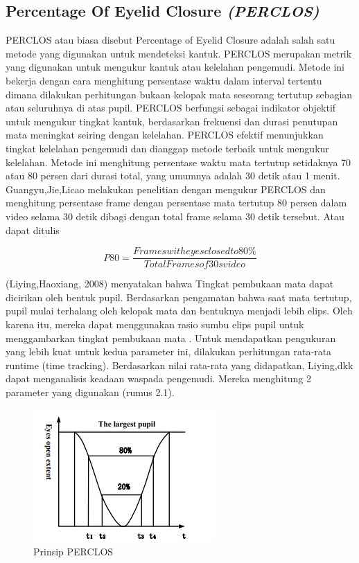 \subsection{Percentage Of Eyelid Closure \emph{(PERCLOS)}}
PERCLOS atau biasa disebut Percentage of Eyelid Closure adalah salah 
satu metode yang digunakan untuk mendeteksi kantuk.
PERCLOS merupakan metrik yang digunakan untuk mengukur kantuk 
atau kelelahan pengemudi. Metode ini bekerja dengan cara 
menghitung persentase waktu dalam interval tertentu dimana dilakukan 
perhitungan bukaan kelopak mata seseorang tertutup sebagian atau 
seluruhnya di atas pupil. PERCLOS berfungsi sebagai indikator 
objektif untuk mengukur tingkat kantuk, berdasarkan frekuensi dan 
durasi penutupan mata meningkat seiring dengan kelelahan. 
PERCLOS efektif menunjukkan tingkat kelelahan pengemudi dan 
dianggap metode terbaik untuk mengukur kelelahan. Metode ini 
menghitung persentase waktu mata tertutup setidaknya 70 
atau 80 persen dari durasi total, yang umumnya adalah 30 
detik atau 1 menit. Guangyu,Jie,Licao melakukan penelitian dengan 
mengukur PERCLOS dan menghitung persentase frame dengan persentase mata tertutup 80 persen dalam video selama 30 detik 
dibagi dengan total frame selama 30 detik tersebut\parencite{Liu2023}. Atau dapat ditulis

\begin{equation}
  P80 = \frac{Frames with eyes closed to 80\% }{Total Frames of 30s video}
\end{equation}

(Liying,Haoxiang, 2008) menyatakan bahwa Tingkat pembukaan mata 
dapat dicirikan oleh bentuk pupil. Berdasarkan pengamatan bahwa 
saat mata tertutup, pupil mulai terhalang oleh kelopak mata dan 
bentuknya menjadi lebih elips. Oleh karena itu, mereka dapat 
menggunakan rasio sumbu elips pupil untuk menggambarkan tingkat 
pembukaan mata \parencite{lang2008study}. Untuk mendapatkan pengukuran yang lebih kuat 
untuk kedua parameter ini, dilakukan perhitungan rata-rata runtime 
(time tracking). Berdasarkan nilai rata-rata yang didapatkan, 
Liying,dkk dapat menganalisis keadaan waspada pengemudi. Mereka menghitung
2 parameter yang digunakan (rumus 2.1).

\begin{figure} [H] \centering
  \includegraphics[scale=1]{gambar/2_2_2.jpg}
  \caption{Prinsip PERCLOS}
  \label{fig:PERCLOS}
\end{figure}

